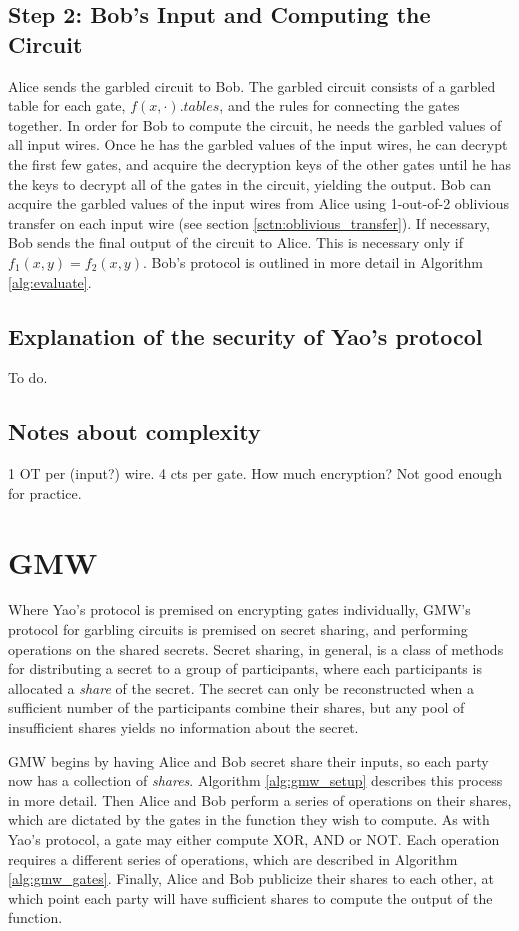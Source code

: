 \subsection{Step 2: Bob's Input and Computing the Circuit}
Alice sends the garbled circuit to Bob. 
The garbled circuit consists of a garbled table for each gate, $f(x,\cdot).tables$, and the rules for connecting the gates together.
In order for Bob to compute the circuit, he needs the garbled values of all input wires.
Once he has the garbled values of the input wires, he can decrypt the first few gates, and acquire the decryption keys of the other gates until he has the keys to decrypt all of the gates in the circuit, yielding the output.
Bob can acquire the garbled values of the input wires from Alice using 1-out-of-2 oblivious transfer on each input wire (see section \ref{sctn:oblivious_transfer}).
If necessary, Bob sends the final output of the circuit to Alice. 
This is necessary only if $f_1(x,y) = f_2(x,y)$. 
Bob's protocol is outlined in more detail in Algorithm \ref{alg:evaluate}.

\subsection{Explanation of the security of Yao's protocol}
To do.

\subsection{Notes about complexity}
1 OT per (input?) wire.
4 cts per gate.
How much encryption?
Not good enough for practice.

\section{GMW}
Where Yao's protocol is premised on encrypting gates individually, GMW's protocol for garbling circuits is premised on secret sharing, and performing operations on the shared secrets. 
Secret sharing, in general, is a class of methods for distributing a secret to a group of participants, where each participants is allocated a \textit{share} of the secret. 
The secret can only be reconstructed when a sufficient number of the participants combine their shares, but any pool of insufficient shares yields no information about the secret.

GMW begins by having Alice and Bob secret share their inputs, so each party now has a collection of \textit{shares}. 
Algorithm \ref{alg:gmw_setup} describes this process in more detail.
Then Alice and Bob perform a series of operations on their shares, which are dictated by the gates in the function they wish to compute.
As with Yao's protocol, a gate may either compute XOR, AND or NOT.
Each operation requires a different series of operations, which are described in Algorithm \ref{alg:gmw_gates}.
Finally, Alice and Bob publicize their shares to each other, at which point each party will have sufficient shares to compute the output of the function.

